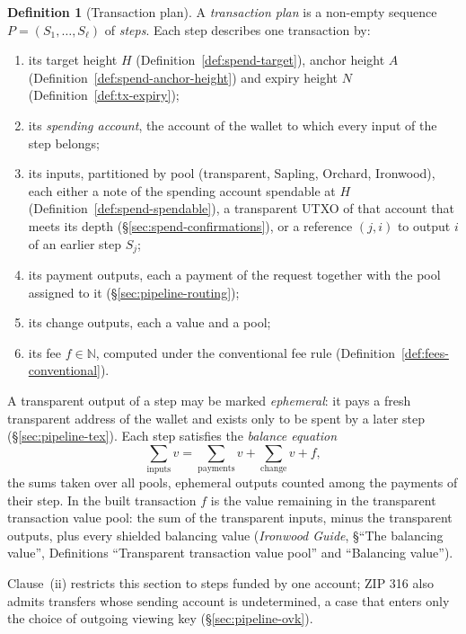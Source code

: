 \documentclass[11pt,a4paper]{article}
\theoremstyle{definition}
\newtheorem{definition}[theorem]{Definition}
\newcommand{\N}{\mathbb{N}}
\begin{document}
\begin{definition}[Transaction plan]\label{def:plan}
A \emph{transaction plan} is a non-empty sequence $P = (S_1, \dots,
S_\ell)$ of \emph{steps}. Each step describes one transaction by:
\begin{enumerate}[label=(\roman*)]
\item its target height $H$ (Definition~\ref{def:spend-target}), anchor
  height $A$ (Definition~\ref{def:spend-anchor-height}) and expiry height
  $N$ (Definition~\ref{def:tx-expiry});
\item its \emph{spending account}, the account of the wallet to which every
  input of the step belongs;
\item its inputs, partitioned by pool (transparent, Sapling, Orchard,
  Ironwood), each either a note of the spending account spendable at $H$
  (Definition~\ref{def:spend-spendable}), a transparent UTXO of that
  account that meets its depth (\S\ref{sec:spend-confirmations}), or a
  reference $(j, i)$ to output $i$ of an earlier step $S_j$;
\item its payment outputs, each a payment of the request together with the
  pool assigned to it (\S\ref{sec:pipeline-routing});
\item its change outputs, each a value and a pool;
\item its fee $f \in \N$, computed under the conventional fee rule
  (Definition~\ref{def:fees-conventional}).
\end{enumerate}
A transparent output of a step may be marked \emph{ephemeral}: it pays a
fresh transparent address of the wallet and exists only to be spent by a
later step (\S\ref{sec:pipeline-tex}). Each step satisfies the
\emph{balance equation}
\[
  \textstyle\sum_{\text{inputs}} v
  = \sum_{\text{payments}} v + \sum_{\text{change}} v + f,
\]
the sums taken over all pools, ephemeral outputs counted among the payments
of their step. In the built transaction $f$ is the value remaining in the
transparent transaction value pool: the sum of the transparent inputs, minus
the transparent outputs, plus every shielded balancing value
(\emph{Ironwood Guide}, \S``The balancing value'', Definitions
``Transparent transaction value pool'' and ``Balancing value'').
\end{definition}

Clause~(ii) restricts this section to steps funded by one account; ZIP 316
also admits transfers whose sending account is undetermined, a case that
enters only the choice of outgoing viewing key (\S\ref{sec:pipeline-ovk}).
\end{document}
